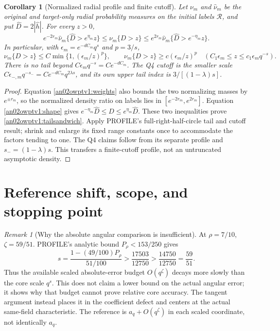 \documentclass[11pt]{article}
\newtheorem{corollary}[theorem]{Corollary}
\theoremstyle{remark}\newtheorem{remark}[theorem]{Remark}
\newcommand{\Rhalf}{\mathcal R}
\begin{document}
\begin{corollary}[Normalized radial profile and finite cutoff]
\label{an02owptv1:tail}
Let $\nu_m$ and $\widehat\nu_m$ be the original and target-only
radial probability measures on the initial labels $\Rhalf$, and put
$\widehat D=2|\widehat h|$. For every $z>0$,
\begin{equation}\label{an02owptv1:tailsandwich}
 e^{-2r_m}\widehat\nu_m\{\widehat D>e^{\eta_m}z\}
 \le\nu_m\{D>z\}
 \le e^{2r_m}\widehat\nu_m\{\widehat D>e^{-\eta_m}z\}.
\end{equation}
In particular, with $\epsilon_m=e^{-dC_m}q^s$ and $p=3/s$,
\begin{equation}\label{an02owptv1:tailpowers}
 \nu_m\{D>z\}\le C\min\{1,(\epsilon_m/z)^p\},
 \qquad
 \nu_m\{D>z\}\ge c(\epsilon_m/z)^p
 \quad(C_1\epsilon_m\le z\le c_1\epsilon_m q^{-s}).
\end{equation}
There is no tail beyond $C\epsilon_m q^{-s}=Ce^{-dC_m}$.
The Q4 cutoff is the smaller scale
$C\epsilon_{-,m}q^{-s_-}=Ce^{-dC_m}q^{2\lambda s}$,
and its own upper tail index is $3/[(1-\lambda)s]$.
\end{corollary}
\begin{proof}
Equation \eqref{an02owptv1:weights} also bounds the two normalizing
masses by $e^{\pm r_m}$, so the normalized density ratio on labels
lies in $[e^{-2r_m},e^{2r_m}]$.
Equation \eqref{an02owptv1:shape} gives
$e^{-\eta_m}\widehat D\le D\le e^{\eta_m}\widehat D$.
These two inequalities prove \eqref{an02owptv1:tailsandwich}.
Apply PROFILE's full-right-half-circle tail and cutoff result;
shrink and enlarge its fixed range constants once to accommodate
the factors tending to one. The Q4 claims follow from its separate
profile and $s_-=(1-\lambda)s$. This transfers a finite-cutoff
profile, not an untruncated asymptotic density.
\end{proof}

\section{Reference shift, scope, and stopping point}
\begin{remark}[Why the absolute angular comparison is insufficient]
\label{an02owptv1:absolutepitfall}
At $\rho=7/10$, $\zeta=59/51$. PROFILE's analytic bound
$P_\rho<153/250$ gives
\[
 s=\frac{1-(49/100)P_\rho}{51/100}
 >\frac{17503}{12750}
 >\frac{14750}{12750}=\frac{59}{51}.
\]
Thus the available scaled absolute-error budget $O(q^\zeta)$
decays more slowly than the core scale $q^s$. This does not claim a
lower bound on the actual angular error; it shows why that budget
cannot prove relative core accuracy. The tangent argument instead
places it in the coefficient defect and centers at the actual
same-field characteristic. The reference is $a_q+O(q^\zeta)$ in
each scaled coordinate, not identically $a_q$.
\end{remark}
\end{document}
